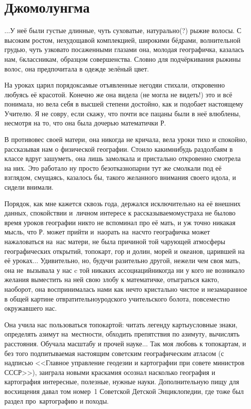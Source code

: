 \newpage
\section*{Джомолунгма}

$\ldots$У неё были густые длинные, чуть суховатые, натурально(?) рыжие волосы. С высоким ростом, нехудощавой комплекцией, широкими бёдрами, волнительной грудью, чуть узковато посаженными глазами она, молодая географичка, казалась нам, 6\sdash классникам, образцом совершенства. Словно для подчёркивания рыжины волос, она предпочитала в одежде зелёный цвет. 

На уроках царил порядок\mdash самые отъявленные негодяи стихали, откровенно любуясь её красотой. Конечно же она видела (не могла не видеть!) это и всё понимала, но вела себя в высшей степени достойно, как и подобает настоящему Учителю. Я не совру, если скажу, что почти все пацаны были в неё влюблены, несмотря на то, что она была дочерью математички Р.

В противовес своей матери, она никогда не кричала, вела уроки тихо и спокойно, рассказывая нам о физической географии. Стоило каким\sdash нибудь раздолбаям в классе вдруг зашуметь, она лишь замолкала и пристально откровенно смотрела на них. Это работало ну просто безотказно\mdash парни тут же смолкали под её взглядом, смущаясь, казалось бы, такого желанного внимания своего идола, и сидели внимали. 

Порядок, как мне кажется сквозь года, держался исключительно на её внешних данных, спокойствии и~личном интересе к рассказываемому\mdash страха не было\mdash во время уроков географии никто не вспоминал про её мать, и уж точно никакая мысль, что Р. может прийти и~наорать на~нас\mdash что географичка может нажаловаться на~нас матери, не была причиной той чарующей атмосферы географических открытий, топокарт, гор и долин, морей и океанов, царившей на её уроках$\ldots$ Удивительно, но, будучи разительно другой, нежели чем своя мать, она не~вызывала у нас c той никаких ассоциаций\mdash никогда ни у кого не возникало желания выместить на ней свою злобу к математичке, отыграться как\sdash то, наоборот, она воспринималась нами как нечто кристально чистое и незамаранное в общей картине отвратительно\sdash уродского учительского болота, повсеместно окружавшего нас.
 
Она учила нас пользоваться топокартой: читать легенду карты\mdash условные знаки, определять азимут на~местности, обходить препятствия по азимуту, вычислять расстояния. Обучала масштабу и прочей науке$\ldots$ Так моя любовь к топокартам, и без того подпитываемая настоящим советским географическим атласом (с надписью <<Главное управление геодезии и картографии при совете министров СССР>>), заиграла новыми красками\mdash я осознал насколько география и картография интересные, полезные, нужные науки. Дополнительную пищу для восхищения давал том номер~1 Советской Детской Энциклопедии, где тоже был раздел про~картографию и походы. 

